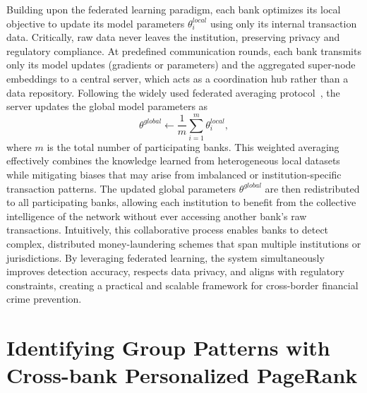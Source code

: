 
Building upon the federated learning paradigm, each bank optimizes its local objective to update its model parameters $\theta_i^{local}$ using only its internal transaction data. Critically, raw data never leaves the institution, preserving privacy and regulatory compliance. At predefined communication rounds, each bank transmits only its model updates (gradients or parameters) and the aggregated super-node embeddings to a central server, which acts as a coordination hub rather than a data repository. Following the widely used federated averaging protocol~\parencite{zhang2021survey, li2020review}, the server updates the global model parameters as
\begin{equation}
    \theta^{global} \leftarrow \frac{1}{m} \sum_{i=1}^{m} \theta_i^{local},
\end{equation}
where $m$ is the total number of participating banks. This weighted averaging effectively combines the knowledge learned from heterogeneous local datasets while mitigating biases that may arise from imbalanced or institution-specific transaction patterns. The updated global parameters $\theta^{global}$ are then redistributed to all participating banks, allowing each institution to benefit from the collective intelligence of the network without ever accessing another bank’s raw transactions. Intuitively, this collaborative process enables banks to detect complex, distributed money-laundering schemes that span multiple institutions or jurisdictions. By leveraging federated learning, the system simultaneously improves detection accuracy, respects data privacy, and aligns with regulatory constraints, creating a practical and scalable framework for cross-border financial crime prevention.



\section{Identifying Group Patterns with Cross-bank Personalized PageRank}
